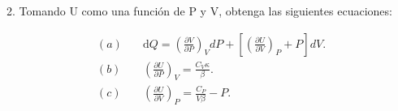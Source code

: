 2. Tomando $\mathrm{U}$ como una función de P y V, obtenga las siguientes ecuaciones:

\begin{align*}
(a)&\quad \mathrm{d} Q=\left(\frac{\partial V}{\partial P}\right)_V d P+\left[\left(\frac{\partial U}{\partial V}\right)_P+P\right] d V.\\
(b)&\quad \left(\frac{\partial U}{\partial P}\right)_V=\frac{C_V \kappa}{\beta}.\\
(c)&\quad \left(\frac{\partial U}{\partial V}\right)_P=\frac{C_P}{V \beta}-P.\\    
\end{align*}